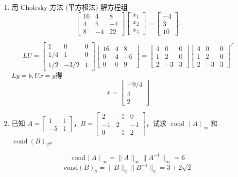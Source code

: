 \documentclass[a4paper]{article}
\begin{document}
\begin{enumerate}
  \item 用 Cholesky 方法 (平方根法) 解方程组
  $$\begin{bmatrix}
  16 & 4 & 8 \\
  4 & 5 & -4 \\
  8 & -4 & 22
  \end{bmatrix}
  \begin{bmatrix}
  x_1 \\
  x_2 \\
  x_3
  \end{bmatrix}
  =
  \begin{bmatrix}
  -4 \\
  3 \\
  10
  \end{bmatrix}.$$
  \begin{solution}
    $$LU=\begin{bmatrix}1&0&0\\1/4&1&0\\1/2&-3/2&1\end{bmatrix}\begin{bmatrix}16&4&8\\0&4&-6\\0&0&9\end{bmatrix}=
    \begin{bmatrix}
      4 & 0 & 0 \\
      1 & 2 & 0 \\
      2 & -3 & 3
    \end{bmatrix}\begin{bmatrix}
      4 & 0 & 0 \\
      1 & 2 & 0 \\
      2 & -3 & 3
    \end{bmatrix}^T$$
    $Ly=b,Ux=y$得
    $$x=\begin{bmatrix} -9/4 \\ 4 \\2 \end{bmatrix}$$
  \end{solution}

  \item 已知 $A = \begin{bmatrix} 1 & 1 \\ -5 & 1 \end{bmatrix}$，$B = \begin{bmatrix} 2 & -1 & 0 \\ -1 & 2 & -1 \\ 0 & -1 & 2 \end{bmatrix}$，试求 $\operatorname{cond}(A)_{\infty}$ 和 $\operatorname{cond}(B)_{2}$。
  \begin{solution}
    $$\text{cond}(A)_\infty=\|A\|_\infty\|A^{-1}\|_\infty=6$$
    $$\text{cond}(B)_2=\|B\|_2\|B^{-1}\|_2=3+2\sqrt{2}$$
  \end{solution}



\end{enumerate}
\end{document}
